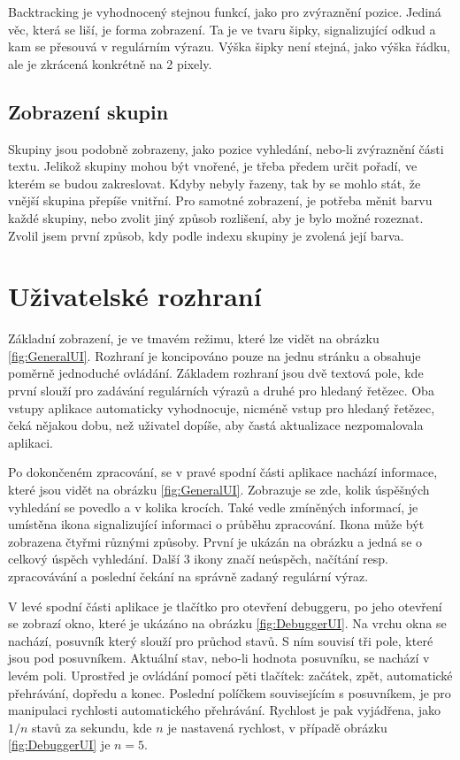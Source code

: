 Backtracking je vyhodnocený stejnou funkcí, jako pro zvýraznění pozice.
Jediná věc, která se liší, je forma zobrazení. 
Ta je ve tvaru šipky, signalizující odkud a kam se přesouvá v regulárním výrazu.
Výška šipky není stejná, jako výška řádku, ale je zkrácená konkrétně na 2 pixely.

\subsection*{Zobrazení skupin}

Skupiny jsou podobně zobrazeny, jako pozice vyhledání, nebo-li zvýraznění části textu.
Jelikož skupiny mohou být vnořené, je třeba předem určit pořadí, ve kterém se budou zakreslovat.
Kdyby nebyly řazeny, tak by se mohlo stát, že vnější skupina přepíše vnitřní.
Pro samotné zobrazení, je potřeba měnit barvu každé skupiny, nebo zvolit jiný způsob rozlišení, aby je bylo možné rozeznat.
Zvolil jsem první způsob, kdy podle indexu skupiny je zvolená její barva.

\section{Uživatelské rozhraní}

Základní zobrazení, je ve tmavém režimu, které lze vidět na obrázku \ref{fig:GeneralUI}.
Rozhraní je koncipováno pouze na jednu stránku a obsahuje poměrně jednoduché ovládání.
Základem rozhraní jsou dvě textová pole, kde první slouží pro zadávání regulárních výrazů a druhé pro hledaný řetězec.
Oba vstupy aplikace automaticky vyhodnocuje, nicméně vstup pro hledaný řetězec, čeká nějakou dobu, než uživatel dopíše, aby častá aktualizace nezpomalovala aplikaci.

Po dokončeném zpracování, se v pravé spodní části aplikace nachází informace, které jsou vidět na obrázku \ref{fig:GeneralUI}.
Zobrazuje se zde, kolik úspěšných vyhledání se povedlo a v kolika krocích.
Také vedle zmíněných informací, je umístěna ikona signalizující informaci o průběhu zpracování.
Ikona může být zobrazena čtyřmi různými způsoby.
První je ukázán na obrázku a jedná se o celkový úspěch vyhledání.
Další 3 ikony značí neúspěch, načítání resp. zpracovávání a poslední čekání na správně zadaný regulární výraz.

V levé spodní části aplikace je tlačítko pro otevření debuggeru, po jeho otevření se zobrazí okno, které je ukázáno na obrázku \ref{fig:DebuggerUI}.
Na vrchu okna se nachází, posuvník který slouží pro průchod stavů.
S ním souvisí tři pole, které jsou pod posuvníkem.
Aktuální stav, nebo-li hodnota posuvníku, se nachází v levém poli.
Uprostřed je ovládání pomocí pěti tlačítek: začátek, zpět, automatické přehrávání, dopředu a konec.
Poslední políčkem souvisejícím s posuvníkem, je pro manipulaci rychlosti automatického přehrávání.
Rychlost je pak vyjádřena, jako $1/n$ stavů za sekundu, kde $n$ je nastavená rychlost, v případě obrázku \ref{fig:DebuggerUI} je $n = 5$.

